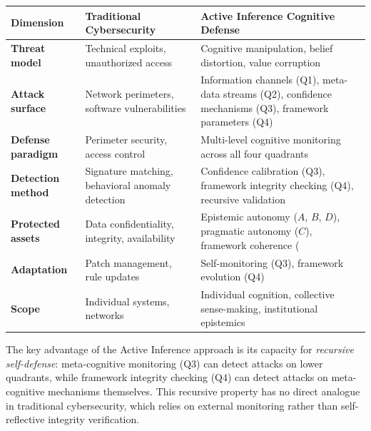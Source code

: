 \documentclass[
]{article}
\newcounter{none} %
\begin{document}
{\def\LTcaptype{none} %
\begin{longtable}[]{@{}
  >{\raggedright\arraybackslash}p{}
  >{\raggedright\arraybackslash}p{}
  >{\raggedright\arraybackslash}p{}@{}}
\toprule\noalign{}
\begin{minipage}[b]{\linewidth}\raggedright
Dimension
\end{minipage} & \begin{minipage}[b]{\linewidth}\raggedright
Traditional Cybersecurity
\end{minipage} & \begin{minipage}[b]{\linewidth}\raggedright
Active Inference Cognitive Defense
\end{minipage} \\
\midrule\noalign{}
\endhead
\bottomrule\noalign{}
\endlastfoot
\textbf{Threat model} & Technical exploits, unauthorized access &
Cognitive manipulation, belief distortion, value corruption \\
\textbf{Attack surface} & Network perimeters, software vulnerabilities &
Information channels (Q1), meta-data streams (Q2), confidence mechanisms
(Q3), framework parameters (Q4) \\
\textbf{Defense paradigm} & Perimeter security, access control &
Multi-level cognitive monitoring across all four quadrants \\
\textbf{Detection method} & Signature matching, behavioral anomaly
detection & Confidence calibration (Q3), framework integrity checking
(Q4), recursive validation \\
\textbf{Protected assets} & Data confidentiality, integrity,
availability & Epistemic autonomy (\(A\), \(B\), \(D\)), pragmatic
autonomy (\(C\)), framework coherence (\(\Theta)) \\
\textbf{Adaptation} & Patch management, rule updates & Self-monitoring
(Q3), framework evolution (Q4) \\
\textbf{Scope} & Individual systems, networks & Individual cognition,
collective sense-making, institutional epistemics \\
\end{longtable}
}

The key advantage of the Active Inference approach is its capacity for
\emph{recursive self-defense}: meta-cognitive monitoring (Q3) can detect
attacks on lower quadrants, while framework integrity checking (Q4) can
detect attacks on meta-cognitive mechanisms themselves. This recursive
property has no direct analogue in traditional cybersecurity, which
relies on external monitoring rather than self-reflective integrity
verification.
\end{document}
